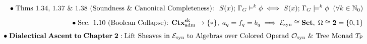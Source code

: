 \documentclass[preview]{standalone}
\begin{document}
\begin{align*}
\special{dvisvgm:raw <g id='unique000'>}\bullet\;\text{Thms 1.34, 1.37 \& 1.38 (Soundness \& Canonical Completeness): }\; S(x);\,\Gamma_G \vdash^k \phi \;\Longleftrightarrow\; S(x);\,\Gamma_G \models^k \phi \;\;(\forall k\in\mathbb{N}_0)\\[4pt]\bullet\;\text{Sec. 1.10 (Boolean Collapse): }\mathbf{Ctx}_{\text{adm}}^{\text{sk}}\to\{*\},\;a_q=f_q=b_q \implies \mathcal{E}_{\text{syn}}\cong\mathbf{Set},\;\Omega\cong\mathbf{2}=\{0,1\}\\[4pt]\bullet\;\mathbf{Dialectical\;Ascent\;to\;Chapter\;2:}\;\text{Lift Sheaves in }\mathcal{E}_{\text{syn}}\text{ to Algebras over Colored Operad }\mathcal{O}_{\text{syn}}\text{ \& Tree Monad }T_{\mathsf{P}}\special{dvisvgm:raw </g>}
\end{align*}
\end{document}
